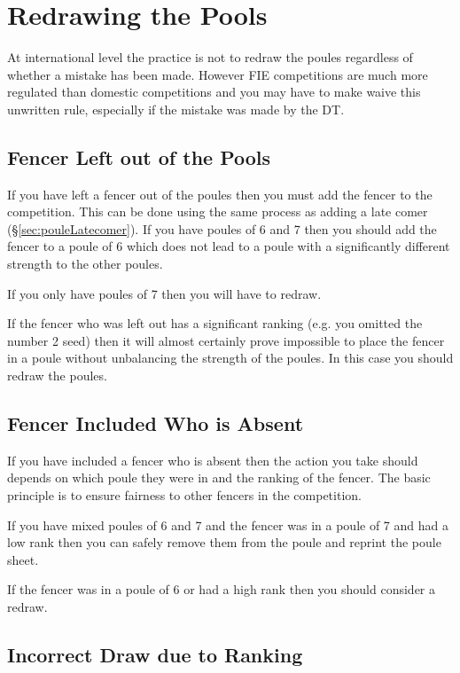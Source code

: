 \documentclass[a4paper,11pt]{memoir}
\begin{document}
\section{Redrawing the Pools}

At international level the practice is not to redraw the poules regardless of whether a mistake has been made. However FIE competitions are much more regulated than domestic competitions and you may have to make waive this unwritten rule, especially if the mistake was made by the DT.

\subsection{Fencer Left out of the Pools}

If you have left a fencer out of the poules then you must add the fencer to the competition. This can be done using the same process as adding a late comer (\S\ref{sec:pouleLatecomer}). If you have poules of 6 and 7 then you should add the fencer to a poule of 6 which does not lead to a poule with a significantly different strength to the other poules.

If you only have poules of 7 then you will have to redraw.

If the fencer who was left out has a significant ranking (e.g. you omitted the number 2 seed) then it will almost certainly prove impossible to place the fencer in a poule without unbalancing the strength of the poules. In this case you should redraw the poules.

\subsection{Fencer Included Who is Absent}

If you have included a fencer who is absent then the action you take should depends on which poule they were in and the ranking of the fencer. The basic principle is to ensure fairness to other fencers in the competition.

If you have mixed poules of 6 and 7 and the fencer was in a poule of 7 and had a low rank then you can safely remove them from the poule and reprint the poule sheet.

If the fencer was in a poule of 6 or had a high rank then you should consider a redraw. 

\subsection{Incorrect Draw due to Ranking}
\end{document}
